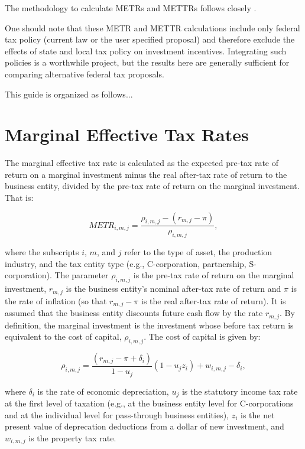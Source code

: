 \documentclass[article,11pt,letterpaper,fleqn]{article}
\theoremstyle{definition}
\numberwithin{equation}{section}
\newcommand{\cn}{\citeasnoun} %
\begin{document}
The methodology to calculate METRs and METTRs follows closely \cn{CBO_ETRs}.

One should note that these METR and METTR calculations include only federal tax policy (current law or the user specified proposal) and therefore exclude the effects of state and local tax policy on investment incentives.  Integrating such policies is a worthwhile project, but the results here are generally sufficient for comparing alternative federal tax proposals.


This guide is organized as follows...

\section{Marginal Effective Tax Rates}

The marginal effective tax rate is calculated as the expected pre-tax rate of return on a marginal investment minus the real after-tax rate of return to the business entity, divided by the pre-tax rate of return on the marginal investment.  That is: 

\begin{equation}
METR_{i,m,j} = \frac{\rho_{i,m,j} - (r_{m,j}-\pi)}{\rho_{i,m,j}},
\end{equation}

\noindent\noindent where the subscripts $i$, $m$, and $j$ refer to the type of asset, the production industry, and the tax entity type (e.g., C-corporation, partnership, S-corporation).  The parameter $\rho_{i,m,j}$ is the pre-tax rate of return on the marginal investment, $r_{m,j}$ is the business entity's nominal after-tax rate of return and $\pi$ is the rate of inflation (so that $r_{m,j}-\pi$ is the real after-tax rate of return).  It is assumed that the business entity discounts future cash flow by the rate $r_{m,j}$.  By definition, the marginal investment is the investment whose before tax return is equivalent to the cost of capital, $\rho_{i,m,j}$.  The cost of capital is given by:

\begin{equation}
\rho_{i,m,j} = \frac{(r_{m,j}-\pi+\delta_{i})}{1-u_{j}}(1-u_{j}z_{i})+w_{i,m,j}-\delta_{i},
\end{equation}  

\noindent\noindent where $\delta_{i}$ is the rate of economic depreciation, $u_{j}$ is the statutory income tax rate at the first level of taxation (e.g., at the business entity level for C-corporations and at the individual level for pass-through business entities), $z_{i}$ is the net present value of deprecation deductions from a dollar of new investment, and $w_{i,m,j}$ is the property tax rate.  
\end{document}
